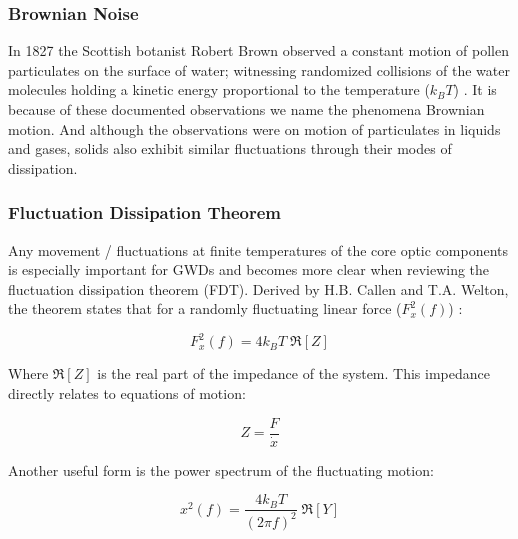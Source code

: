 \subsubsection*{Brownian Noise}
In 1827 the Scottish botanist Robert Brown observed a constant motion of pollen particulates on the surface of water; witnessing randomized collisions of the water molecules holding a kinetic energy proportional to the temperature ($k_BT$) \cite{brown:1828}. It is because of these documented observations we name the phenomena Brownian motion. And although the observations were on motion of particulates in liquids and gases, solids also exhibit similar fluctuations through their modes of dissipation. 

\subsubsection*{Fluctuation Dissipation Theorem}
Any movement / fluctuations at finite temperatures of the core optic components is especially important for GWDs and becomes more clear when reviewing the fluctuation dissipation theorem (FDT). Derived by H.B. Callen and T.A. Welton, the theorem states that for a randomly fluctuating linear force ($F_x^2(f)$) \cite{callen:1951}:


\begin{equation}
F_x^2(f) = 4 k_B T\; \Re[Z]
\end{equation}

\noindent Where $\Re[Z]$ is the real part of the impedance of the system. This impedance directly relates to equations of motion:

 \begin{equation}
 Z = \frac{F}{\dot{x}}
 \end{equation}

 \noindent Another useful form is the power spectrum of the fluctuating motion:

\begin{equation}\label{eq:fdtpsd}
x^2 (f)  = \frac{4k_B T}{(2 \pi f)^2}\; \Re[Y]
\end{equation}

